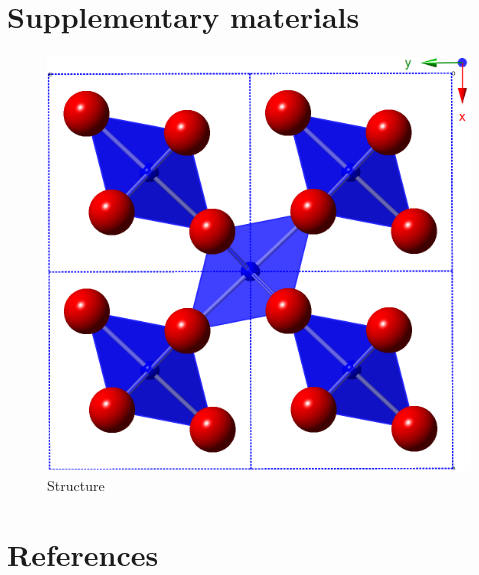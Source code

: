 \documentclass[review]{elsarticle}
\begin{document}
\clearpage


\section{Supplementary materials}


\begin{figure}[ht!]
  \centering
  \includegraphics[width=1.0\textwidth]{figures/s6239_long_rrp.pdf}
  \caption{Structure}
  \label{fig:structure}
\end{figure}

\clearpage
\section*{References}


\end{document}
